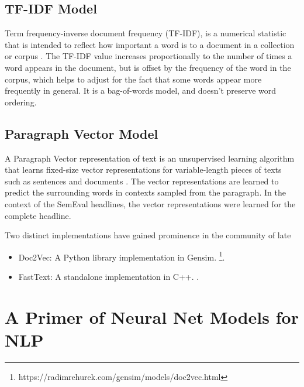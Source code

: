 \documentclass[11pt,a4paper]{article}
\begin{document}

  \subsection{TF-IDF Model} %
  \label{sub:tf_idf_model}
    Term frequency-inverse document frequency (TF-IDF), is a numerical statistic that is intended to reflect how important a word is to a document in a collection or corpus \cite{sparck1972statistical}. The TF-IDF value increases proportionally to the number of times a word appears in the document, but is offset by the frequency of the word in the corpus, which helps to adjust for the fact that some words appear more frequently in general. It is a bag-of-words model, and doesn't preserve word ordering.


  \subsection{Paragraph Vector Model} %
  \label{sub:paragraph_vectors_doc2vec}

    A Paragraph Vector representation of text is an unsupervised learning algorithm that learns fixed-size vector representations for variable-length pieces of texts such as sentences and documents \cite{le2014distributed}. The vector representations are learned to predict the surrounding words in contexts sampled from the paragraph. In the context of the SemEval headlines, the vector representations were learned for the complete headline.

    Two distinct implementations have gained prominence in the community of late
    \begin{itemize}
      \item
        Doc2Vec: A Python library implementation in Gensim. \footnote{https://radimrehurek.com/gensim/models/doc2vec.html}.
      \item
        FastText: A standalone implementation in C++. \cite{bojanowski2016enriching} \cite{joulin2016bag}.
    \end{itemize}




\section{A Primer of Neural Net Models for NLP} %
\label{sec:a_primer_of_neural_net_models_for_nlp}
\end{document}
